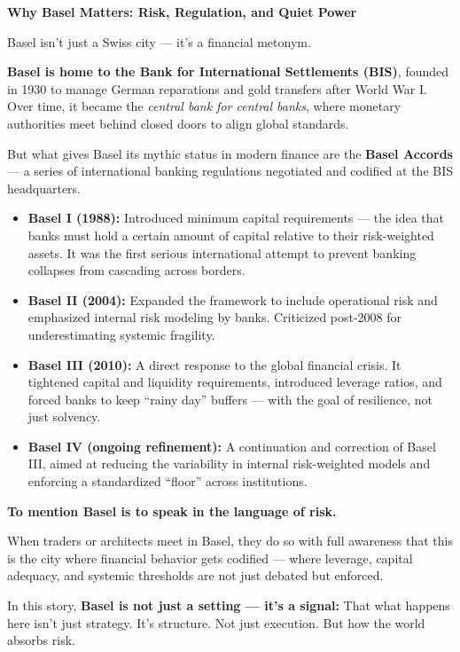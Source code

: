 \begin{HistoricalSidebar}{\textbf{Why Basel Matters: Risk, Regulation, and Quiet Power}}

    Basel isn’t just a Swiss city — it’s a financial metonym.
    
    \medskip
    
    \textbf{Basel is home to the Bank for International Settlements (BIS)}, founded in 1930 to manage German reparations and gold transfers after World War I. Over time, it became the \textit{central bank for central banks}, where monetary authorities meet behind closed doors to align global standards.
    
    \medskip
    
    But what gives Basel its mythic status in modern finance are the \textbf{Basel Accords} — a series of international banking regulations negotiated and codified at the BIS headquarters.


\medskip
    
    \begin{itemize}
      \item \textbf{Basel I (1988):} Introduced minimum capital requirements — the idea that banks must hold a certain amount of capital relative to their risk-weighted assets. It was the first serious international attempt to prevent banking collapses from cascading across borders.
    
      \item \textbf{Basel II (2004):} Expanded the framework to include operational risk and emphasized internal risk modeling by banks. Criticized post-2008 for underestimating systemic fragility.
    
      \item \textbf{Basel III (2010):} A direct response to the global financial crisis. It tightened capital and liquidity requirements, introduced leverage ratios, and forced banks to keep “rainy day” buffers — with the goal of resilience, not just solvency.
    
      \item \textbf{Basel IV (ongoing refinement):} A continuation and correction of Basel III, aimed at reducing the variability in internal risk-weighted models and enforcing a standardized “floor” across institutions.
    \end{itemize}
    
    \medskip
    
    \textbf{To mention Basel is to speak in the language of risk.}
    
    When traders or architects meet in Basel, they do so with full awareness that this is the city where financial behavior gets codified — where leverage, capital adequacy, and systemic thresholds are not just debated but enforced.
    
    \medskip
    
    In this story, \textbf{Basel is not just a setting — it's a signal:}  
    That what happens here isn’t just strategy. It’s structure.  
    Not just execution. But how the world absorbs risk.
    
\end{HistoricalSidebar}


